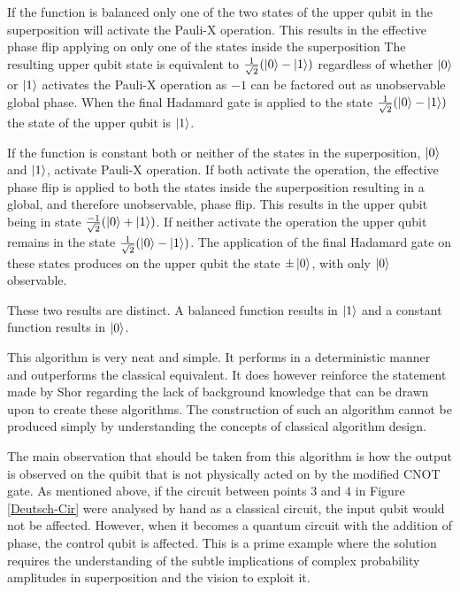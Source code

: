 If the function is balanced only one of the two states of the upper qubit in the superposition will activate the Pauli-X operation.
This results in the effective phase flip applying on only one of the states inside the superposition
The resulting upper qubit state is equivalent to $\frac{1}{\sqrt{2}}(\left\vert{0}\right\rangle-\left\vert{1}\right\rangle)$ regardless of whether $\left\vert{0}\right\rangle$ or $\left\vert{1}\right\rangle$ activates the Pauli-X operation as $-1$ can be factored out as unobservable global phase.
When the final Hadamard gate is applied to the state $\frac{1}{\sqrt{2}}(\left\vert{0}\right\rangle-\left\vert{1}\right\rangle)$ the state of the upper qubit is $\left\vert{1}\right\rangle$.

If the function is constant both or neither of the states in the superposition, $\left\vert{0}\right\rangle$ and $\left\vert{1}\right\rangle$, activate Pauli-X operation.
If both activate the operation, the effective phase flip is applied to both the states inside the superposition resulting in a global, and therefore unobservable, phase flip.
This results in the upper qubit being in state $\frac{-1}{\sqrt{2}}(\left\vert{0}\right\rangle+\left\vert{1}\right\rangle)$.
If neither activate the operation the upper qubit remains in the state $\frac{1}{\sqrt{2}}(\left\vert{0}\right\rangle-\left\vert{1}\right\rangle)$.
The application of the final Hadamard gate on these states produces on the upper qubit the state $\pm\left\vert{0}\right\rangle$, with only $\left\vert{0}\right\rangle$ observable.

These two results are distinct.
A balanced function results in $\left\vert{1}\right\rangle$ and a constant function results in $\left\vert{0}\right\rangle$.

This algorithm is very neat and simple.
It performs in a deterministic manner and outperforms the classical equivalent.
It does however reinforce the statement made by Shor\cite{Shor:2004:PQA:1032132.1032149} regarding the lack of background knowledge that can be drawn upon to create these algorithms.
The construction of such an algorithm cannot be produced simply by understanding the concepts of classical algorithm design.

The main observation that should be taken from this algorithm is how the output is observed on the quibit that is not physically acted on by the modified CNOT gate.
As mentioned above, if the circuit between points $3$ and $4$ in Figure \ref{Deutsch-Cir} were analysed by hand as a classical circuit, the input qubit would not be affected.
However, when it becomes a quantum circuit with the addition of phase, the control qubit is affected.
This is a prime example where the solution requires the understanding of the subtle implications of complex probability amplitudes in superposition and the vision to exploit it.

